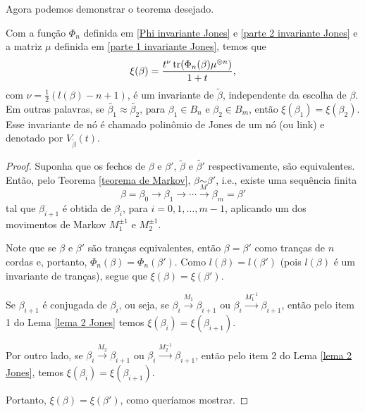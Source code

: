 	Agora podemos demonstrar o teorema desejado.
	\begin{theorem}
	\label{polinomio de Jones}
		Com a função $\Phi_n$ definida em \eqref{Phi invariante Jones} e \eqref{parte 2 invariante Jones} 
		e a matriz $\mu$ definida em \eqref{parte 1 invariante Jones}, temos que
		\begin{equation}
		\label{invariante Jones}
		    \xi(\beta) = \frac{t^{\nu}\operatorname{tr}(\Phi_n(\beta)\mu^{\otimes n})}{1+t},
		\end{equation}
		com $\nu = \displaystyle{ \frac{1}{2}(l(\beta) - n + 1) }$, é um invariante 
		de $\widetilde{\beta}$, independente da escolha de $\beta$. Em outras palavras, se
		$\widetilde{\beta_1}\approx\widetilde{\beta_2}$, para $\beta_1\in B_n$ e $\beta_2\in B_m$, 
		então $\xi(\beta_1) = \xi(\beta_2)$. Esse invariante de nó é chamado polinômio de Jones 
		de um nó (ou link) e denotado por $V_{\widetilde{\beta}}(t)$.
	\end{theorem}
	\begin{proof}
		Suponha que os fechos de $\beta$ e $\beta'$, $\widetilde{\beta}$ e $\widetilde{\beta'}$ 
		respectivamente, são equivalentes. Então, pelo Teorema \ref{teorema de Markov},
		$\beta\underset{M}{\sim}\beta'$, i.e., existe uma sequência finita
		\begin{equation*}
		    \beta = \beta_0\to\beta_1\to\cdots\to\beta_m = \beta'
		\end{equation*}
		tal que $\beta_{i+1}$ é obtida de $\beta_i$, para $i = 0,1,\dots,m-1$, 
		aplicando um dos movimentos de Markov $M_1^{\pm1}$ e $M_2^{\pm1}$.
		
		\par\vspace{0.3cm} Note que se $\beta$ e $\beta'$ são tranças equivalentes, 
		então $\beta = \beta'$ como tranças de $n$ cordas e, portanto, $\Phi_n(\beta) = \Phi_n(\beta')$. 
		Como $l(\beta) = l(\beta')$ (pois $l(\beta)$ é um invariante de tranças), segue que 
		$\xi(\beta) = \xi(\beta')$.
		
		\par\vspace{0.3cm} Se $\beta_{i+1}$ é conjugada de $\beta_i$, ou seja, se
		$\beta_i\xrightarrow{M_1}\beta_{i+1}$ ou $\beta_i\xrightarrow{M_1^{-1}}\beta_{i+1}$, 
		então pelo item 1 do Lema \ref{lema 2 Jones} temos $\xi(\beta_i) = \xi(\beta_{i+1})$.
		
		\par\vspace{0.3cm} Por outro lado, se $\beta_i\xrightarrow{M_2}\beta_{i+1}$ ou
		$\beta_i\xrightarrow{M_2^{-1}}\beta_{i+1}$, então pelo item 2 do Lema \ref{lema 2 Jones}, temos
		$\xi(\beta_i) = \xi(\beta_{i+1})$.
		
		\par\vspace{0.3cm} Portanto, $\xi(\beta) = \xi(\beta')$, como queríamos mostrar.
	\end{proof}
